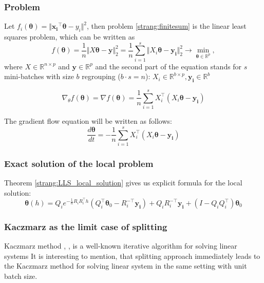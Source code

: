 \documentclass{article}
\newcommand{\vect}[1]{\boldsymbol{\mathbf{#1}}}
\begin{document}
\subsubsection{Problem}
Let $f_i(\vect{\theta}) = \Vert \vect{x_i}^{\top} \vect{\theta} - y_i \Vert^2$, then problem \eqref{strang:finitesum} is the linear least squares problem, which can be written as
\begin{equation}\label{strang:LLS}
   f(\vect{\theta}) = \frac{1}{n}\Vert X \vect{\theta} - \vect{y} \Vert_2^2  = \frac{1}{n}\sum\limits_{i=1}^s\Vert X_i \vect{\theta} - \vect{y_i} \Vert_2^2\to \min_{\vect{\theta} \in \mathbb{R}^p},
\end{equation}
where $X \in \mathbb{R}^{n \times p}$ and $\vect{y} \in \mathbb{R}^p$ and the second part of the equation stands for $s$ mini-batches with size $b$ regrouping ($b \cdot s = n$): $X_i \in \mathbb{R}^{b \times p}, \vect{y_i} \in \mathbb{R}^{b}$

\begin{equation}\label{strang:LLS_grad}
\nabla_\theta f(\vect{\theta}) = \nabla f(\vect{\theta}) = \frac{1}{n}\sum\limits_{i=1}^s X_i^\top(X_i \vect{\theta} - \vect{y_i})
\end{equation}

The gradient flow equation will be written as follows:
\begin{equation}\label{strang:LLS_GF}
\frac{d \vect{\theta}}{d t} = - \frac{1}{n}\sum\limits_{i=1}^s X_i^\top( X_i \vect{\theta} - \vect{y_i})
\end{equation}

\subsubsection{Exact solution of the local problem}
Theorem \ref{strang:LLS_local_solution} gives us explicit formula for the local solution:
$$
\vect{\theta}(h) = Q_i e^{-\frac{1}{n}R_iR_i^\top h} \left( Q_i^\top \vect{\theta}_0 - R_i^{-\top}\vect{y_i}\right) + Q_iR_i^{-\top}\vect{y_i} + (I - Q_iQ_i^\top)\vect{\theta}_0
$$

\subsubsection{Kaczmarz as the limit case of splitting}
Kaczmarz method \cite{kaczmarz1937method}, \cite{strohmer2009randomized}, \cite{gower2015randomized} is a well-known iterative algorithm for solving linear systems
It is interesting to mention, that splitting approach immediately leads to the Kaczmarz method for solving linear system in the same setting with unit batch size.
\end{document}
